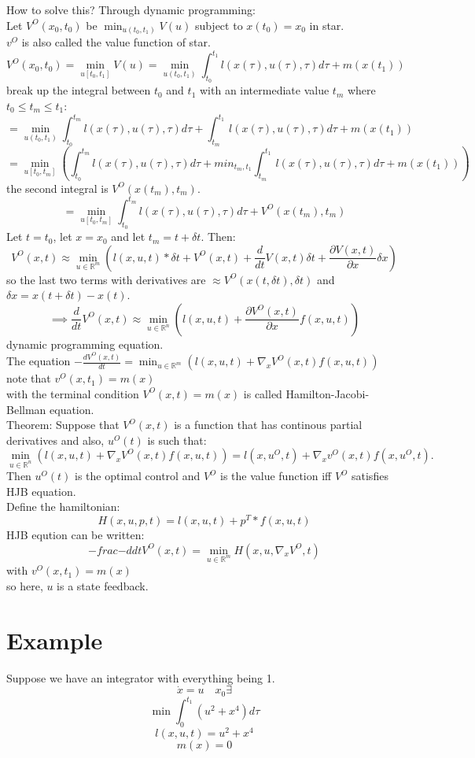 \documentclass{article}
\begin{document}
How to solve this? Through dynamic programming:\\
Let $V^O(x_0,t_0)$ be $\min_{u(t_0,t_1)}V(u)$ subject to $x(t_0)=x_0$ in star.\\
$v^O$ is also called the value function of star.\\
\[V^O(x_0,t_0)=\min_{u[t_0,t_1]}V(u)=\min_{u(t_0,t_1)}\int_{t_0}^{t_1}l(x(\tau),u(\tau),\tau)d\tau+m(x(t_1))\]
break up the integral between $t_0$ and $t_1$ with an intermediate value $t_m$ where $t_0\leq t_m\leq t_1$:
\[=\min_{u(t_0,t_1)}\int_{t_0}^{t_m}l(x(\tau),u(\tau),\tau)d\tau+\int_{t_m}^{t_1}l(x(\tau),u(\tau),\tau)d\tau+m(x(t_1))\]
\[=\min_{u[t_0,t_m]}\left (\int_{t_0}^{t_m}l(x(\tau),u(\tau),\tau)d\tau+min_{t_m,t_1}\int_{t_m}^{t_1}l(x(\tau),u(\tau),\tau)d\tau+m(x(t_1))\right )\]
the second integral is $V^O(x(t_m),t_m)$.\\
\[=\min_{u[t_0,t_m]}\int_{t_0}^{t_m}l(x(\tau),u(\tau),\tau)d\tau+V^O(x(t_m),t_m)\]
Let $t=t_0$, let $x=x_0$ and let $t_m=t+\delta t$. Then:
\[V^O(x,t)\approx\min_{u\in\mathbb{R}^m}(l(x,u,t)*\delta t+V^O(x,t)+\frac{d}{dt}V(x,t)\delta t+\frac{\partial V(x,t)}{\partial x}\delta x)\]
so the last two terms with derivatives are $\approx V^O(x(t,\delta t),\delta t)$ and $\delta x=x(t+\delta t)-x(t)$.
\[\implies \frac{d}{dt}V^O(x,t)\approx\min_{u\in\mathbb{R}^n}(l(x,u,t)+\frac{\partial V^O(x,t)}{\partial x}f(x,u,t))\]
dynamic programming equation.\\
The equation $-\frac{dV^O(x,t)}{dt}=\min_{u\in\mathbb{R}^m}(l(x,u,t)+\nabla_xV^O(x,t)f(x,u,t))$ note that $v^O(x,t_1)=m(x)$\\
with the terminal condition $V^O(x,t)=m(x)$ is called Hamilton-Jacobi-Bellman equation.\\
Theorem: Suppose that $V^O(x,t)$ is a function that has continous partial derivatives and also, $u^O(t)$ is such that:
\[\min_{u\in\mathbb{R}^n}(l(x,u,t)+\nabla_x V^O(x,t)f(x,u,t))=l(x,u^O,t)+\nabla_xv^O(x,t)f(x,u^O,t).\]
Then $u^O(t)$ is the optimal control and $V^O$ is the value function iff $V^O$ satisfies HJB equation.\\

Define the hamiltonian:
\[H(x,u,p,t)=l(x,u,t)+p^T*f(x,u,t)\]
HJB eqution can be written:
\[-frac{-d}{dt}V^O(x,t)=\min_{u\in\mathbb{R}^m}H(x,u,\nabla_xV^O,t)\]
with $v^O(x,t_1)=m(x)$\\

so here, $u$ is a state feedback.

\section{Example}
Suppose we have an integrator with everything being 1.
\[\dot{x}=u\quad x_0 \exists\]
\[\min\int_0^{t_1} (u^2+x^4)d\tau\]
\[l(x,u,t)=u^2+x^4\]
\[m(x)=0\]
\end{document}
